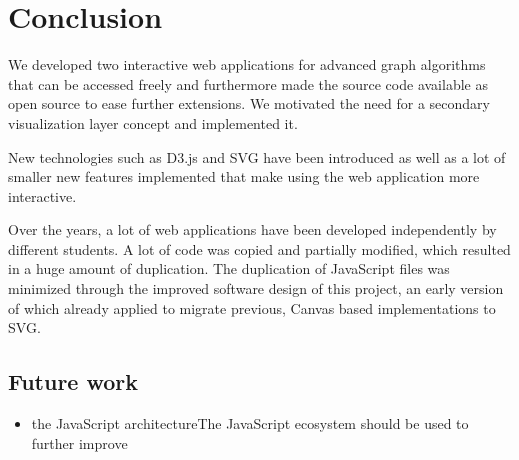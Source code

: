 \chapter{Conclusion}\label{ch:6}
We developed two interactive web applications for advanced graph algorithms that can be accessed freely and furthermore made the source code available as open source to ease further extensions. We motivated the need for a secondary visualization layer concept and implemented it.

New technologies such as D3.js and SVG have been introduced as well as a lot of smaller new features implemented that make using the web application more interactive.

Over the years, a lot of web applications have been developed independently by different students. A lot of code was copied and partially modified, which resulted in a huge amount of duplication. The duplication of JavaScript files was minimized through the improved software design of this project, an early version of which \cite{feil2016idp} already applied to migrate previous, Canvas based implementations \cite{storz2013idp,velden2014idp,sefidgar2015idp,becker2015idp} to SVG.



\section{Future work}
\begin{itemize}
	\item 

	  the JavaScript architectureThe JavaScript ecosystem should be used to further improve 

\end{itemize}